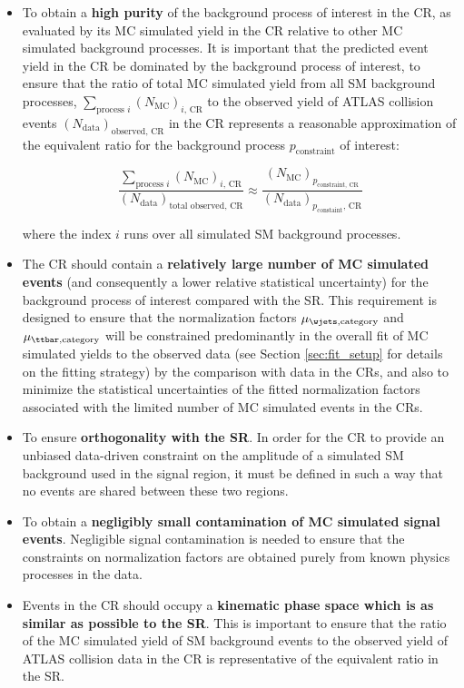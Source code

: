 \begin{itemize}
\item To obtain a \textbf{high purity} of the background process of interest in the CR, as evaluated by its MC simulated yield in the CR relative to other MC simulated background processes. It is important that the predicted event yield in the CR be dominated by the background process of interest, to ensure that the ratio of total MC simulated yield from all SM background processes, \(\sum\limits_{\text{process }i} (N_\text{MC})_{i\text{, CR}}\) to the observed yield of ATLAS collision events \((N_\text{data})_\text{observed, CR}\) in the CR represents a reasonable approximation of the equivalent ratio for the background process \(p_\text{constraint}\) of interest:

\begin{equation}
\label{eq:cr_ratio}
\frac{\sum\limits_{\text{process }i} (N_\text{MC})_{i\text{, CR}}}{(N_\text{data})_\text{total observed, CR}} \approx \frac{(N_\text{MC})_{p_{\text{constraint}\text{, CR}}}}{(N_\text{data})_{p_\text{constaint}\text{, CR}}}
\end{equation}

\noindent where the index \(i\) runs over all simulated SM background processes.

\item The CR should contain a \textbf{relatively large number of MC simulated events} (and consequently a lower relative statistical uncertainty) for the background process of interest compared with the SR. This requirement is designed to ensure that the normalization factors \(\mu_{\wjets, \text{category}}\) and \(\mu_{\ttbar, \text{category}}\) will be constrained predominantly in the overall fit of MC simulated yields to the observed data (see Section \ref{sec:fit_setup} for details on the fitting strategy) by the comparison with data in the CRs, and also to minimize the statistical uncertainties of the fitted normalization factors associated with the limited number of MC simulated events in the CRs. 
\item To ensure \textbf{orthogonality with the SR}. In order for the CR to provide an unbiased data-driven constraint on the amplitude of a simulated SM background used in the signal region, it must be defined in such a way that no events are shared between these two regions.
\item To obtain a \textbf{negligibly small contamination of MC simulated signal events}. Negligible signal contamination is needed to ensure that the constraints on normalization factors are obtained purely from known physics processes in the data.
\item Events in the CR should occupy a \textbf{kinematic phase space which is as similar as possible to the SR}. This is important to ensure that the ratio of the MC simulated yield of SM background events to the observed yield of ATLAS collision data in the CR is representative of the equivalent ratio in the SR.
\end{itemize}

